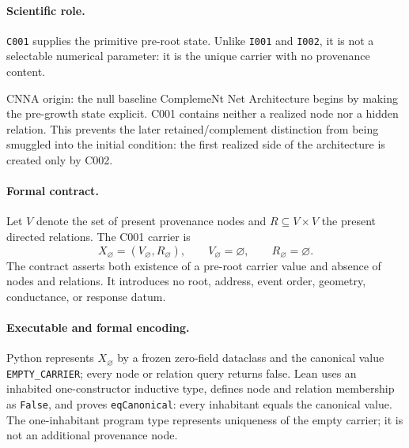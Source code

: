
\paragraph*{Scientific role.}
\texttt{C001} supplies the primitive pre-root state.  Unlike \texttt{I001} and
\texttt{I002}, it is not a selectable numerical parameter: it is the unique
carrier with no provenance content.

\begin{cnnaInfoBox}{CNNA origin: the null baseline}
ComplemeNt Net Architecture begins by making the pre-growth state explicit.  C001 contains neither a realized node nor a hidden relation.  This prevents the later retained/complement distinction from being smuggled into the initial condition: the first realized side of the architecture is created only by C002.
\end{cnnaInfoBox}

\paragraph*{Formal contract.}
Let $V$ denote the set of present provenance nodes and $R\subseteq V\times V$
the present directed relations.  The C001 carrier is
\begin{equation}
  X_{\varnothing}=(V_{\varnothing},R_{\varnothing}),
  \qquad V_{\varnothing}=\varnothing,
  \qquad R_{\varnothing}=\varnothing.
  \label{eq:c001-empty-carrier}
\end{equation}
The contract asserts both existence of a pre-root carrier value and absence of
nodes and relations.  It introduces no root, address, event order, geometry,
conductance, or response datum.

\paragraph*{Executable and formal encoding.}
Python represents $X_{\varnothing}$ by a frozen zero-field dataclass and the
canonical value \texttt{EMPTY\_CARRIER}; every node or relation query returns
false.  Lean uses an inhabited one-constructor inductive type, defines node and
relation membership as \texttt{False}, and proves
\texttt{eqCanonical}: every inhabitant equals the canonical value.  The
one-inhabitant program type represents uniqueness of the empty carrier; it is
not an additional provenance node.

